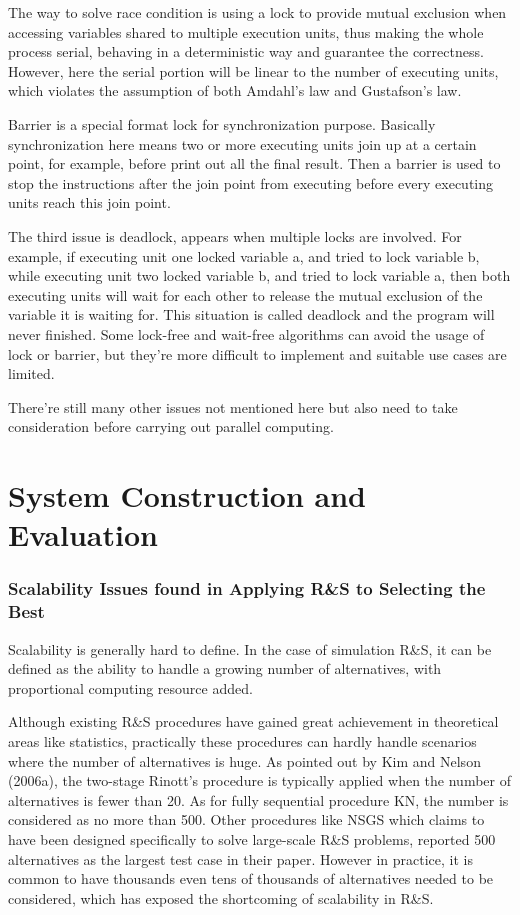 \documentclass[12pt,a4paper]{report}
\begin{document}
The way to solve race condition is using a lock to provide mutual exclusion when accessing variables shared to multiple execution units, thus making the whole process serial, behaving in a deterministic way and guarantee the correctness. However, here the serial portion will be linear to the number of executing units, which violates the assumption of both Amdahl's law and Gustafson's law.

Barrier is a special format lock for synchronization purpose. Basically synchronization here means two or more executing units join up at a certain point, for example, before print out all the final result. Then a barrier is used to stop the instructions after the join point from executing before every executing units reach this join point.

The third issue is deadlock, appears when multiple locks are involved. For example, if executing unit one locked variable a, and tried to lock variable b, while executing unit two locked variable b, and tried to lock variable a, then both executing units will wait for each other to release the mutual exclusion of the variable it is waiting for. This situation is called deadlock and the program will never finished. Some lock-free and wait-free algorithms can avoid the usage of lock or barrier, but they're more difficult to implement and suitable use cases are limited.

There're still many other issues not mentioned here but also need to take consideration before carrying out parallel computing.

\chapter{System Construction and Evaluation}

\subsection{Scalability Issues found in Applying R\&S to Selecting the Best}

Scalability is generally hard to define. In the case of simulation R\&S, it can be defined as the ability to handle a growing number of alternatives, with proportional computing resource added.

Although existing R\&S procedures have gained great achievement in theoretical areas like statistics, practically these procedures can hardly handle scenarios where the number of alternatives is huge. As pointed out by Kim and Nelson (2006a), the two-stage Rinott’s procedure is typically applied when the number of alternatives is fewer than 20. As for fully sequential procedure KN, the number is considered as no more than 500. Other procedures like NSGS which claims to have been designed specifically to solve large-scale R\&S problems, reported 500 alternatives as the largest test case in their paper. However in practice, it is common to have thousands even tens of thousands of alternatives needed to be considered, which has exposed the shortcoming of scalability in R\&S.
\end{document}
